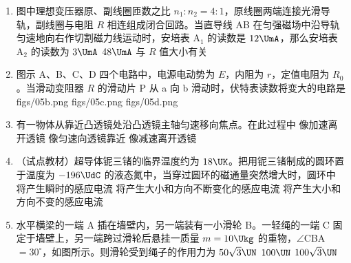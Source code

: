 \documentclass[\gkver]{gaokaozhenti}
\begin{document}
\begin{enumerate}
\item
图中理想变压器原、副线圈匝数之比 $n_{1}:n_{2} = 4:1$，原线圈两端连接光滑导轨，副线圈与电阻 $R$ 相连组成闭合回路。当直导线 AB 在匀强磁场中沿导轨匀速地向右作切割磁力线运动时，安培表 A$_{1}$ 的读数是 $12\UmA$，那么安培表 A$_{2}$ 的读数为
\onepicture[w=6.14cm]{}
{$3\UmA$}
{$48\UmA$}
{与 $R$ 值大小有关}

\item
图示 A、B、C、D 四个电路中，电源电动势为 $E$，内阻为 $r$，定值电阻为 $R_{0}$。当滑动变阻器 $R$ 的滑动片 P 从 a 向 b 滑动时，伏特表读数将变大的电路是
{figs/05b.png}
{figs/05c.png}
{figs/05d.png}

\item
有一物体从靠近凸透镜处沿凸透镜主轴匀速移向焦点。在此过程中
{像加速离开透镜}
{像匀速向透镜靠近}
{像减速离开透镜}

\item
（试点教材）超导体铌三锗的临界温度约为 $18\UK$。把用铌三锗制成的圆环置于温度为 $-196\UdC$ 的液态氮中，当穿过圆环的磁通量突然增大时，圆环中
{将产生瞬时的感应电流}
{将产生大小和方向不断变化的感应电流}
{将产生大小和方向不变的感应电流}

\item
水平横梁的一端 A 插在墙壁内，另一端装有一小滑轮 B。一轻绳的一端 C 固定于墙壁上，另一端跨过滑轮后悬挂一质量 $m = 10\Ukg$ 的重物，$\angle$CBA $= 30^{\circ}$，如图所示。则滑轮受到绳子的作用力为
\onepicture[h=3.62cm]{}
\fourchoices[answer=C]
{$50\UN$}
{$50\sqrt{3}\UN$}
{$100\UN$}
{$100\sqrt{3}\UN$}


\end{enumerate}
\end{document}
